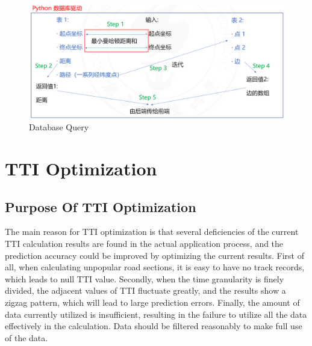 \documentclass[fontset=none]{ctexart}
\theoremstyle{definition}
\theoremstyle{remark}
\begin{document}
\begin{figure}[htb]
  \centering
  \includegraphics[width=\textwidth]{images/db_query.png}
  \caption{Database Query}
  \label{db}
\end{figure}

\section{TTI Optimization}
\subsection{Purpose Of TTI Optimization}
The main reason for TTI optimization is that several deficiencies of the current TTI calculation results are found in the actual application process, and the prediction accuracy could be improved by optimizing the current results.
First of all, when calculating unpopular road sections, it is easy to have no track records, which leads to null TTI value. 
Secondly, when the time granularity is finely divided, the adjacent values of TTI fluctuate greatly, and the results show a zigzag pattern, which will lead to large prediction errors.
Finally, the amount of data currently utilized is insufficient, resulting in the failure to utilize all the data effectively in the calculation. Data should be filtered reasonably to make full use of the data.
\end{document}
